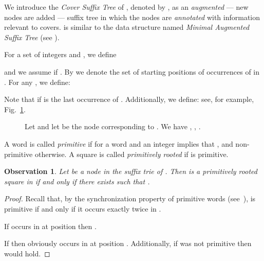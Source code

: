 \documentclass{article}
\theoremstyle{theorem}
\newtheorem{observation}{Observation}
\theoremstyle{definition}
\renewcommand{\c}{\mathit{cv}}
\begin{document}
  We introduce the \emph{Cover Suffix Tree} of , denoted by ,
  as an \emph{augmented} --- new nodes are added --- suffix tree in which the
  nodes are \emph{annotated} with information relevant to covers.  is similar to the data structure named \emph{Minimal Augmented Suffix Tree}
  (see \cite{DBLP:journals/algorithmica/ApostolicoP96,DBLP:conf/icalp/BrodalLOP02}).

  For a set  of integers and , we define
  
  and we assume  if .
  By  we denote the set of starting positions of occurrences of  in .
  For any , we define:
  
  Note that  if  is the last occurrence of .
  Additionally, we define:
   see, for example,
  Fig.~\ref{fig:c_Delta}.

    \begin{figure}[htb]
      \centering
       \caption{\label{fig:c_Delta}
        Let  and let  be the node corresponding to .
        We have , , .
      }
    \end{figure}

  A word  is called \emph{primitive} if  for a word  and an integer  implies that , and
  non-primitive otherwise.
  A square  is called \emph{primitively rooted} if  is primitive.

  \begin{observation}\label{obs:primitively_rooted_square}
    Let  be a node in the suffix trie of .
    Then  is a primitively rooted square in 
    if and only if there exists  such that .
  \end{observation}
  \begin{proof}
    Recall that, by the synchronization property of primitive words (see~\cite{AlgorithmsOnStrings}),
     is primitive if and only if it occurs exactly twice in .

    
    If  occurs in  at position  then .

     If  then obviously  occurs in  at position .
    Additionally, if  was not primitive then  would hold.
  \end{proof}
\end{document}
